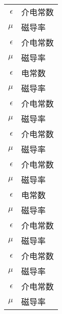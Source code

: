 \begin{nomenclature}
\begin{longtable}{rl}
  $\epsilon$    & 介电常数 \\
  $\mu$         & 磁导率 \\
  $\epsilon$    & 介电常数 \\
  $\mu$         & 磁导率 \\
  $\epsilon$    & 电常数 \\
  $\mu$         & 磁导率 \\
  $\epsilon$    & 介电常数 \\
  $\mu$         & 磁导率 \\
  $\epsilon$    & 介电常数 \\
  $\mu$         & 磁导率 \\
  $\epsilon$    & 介电常数 \\
  $\mu$         & 磁导率 \\
  $\epsilon$    & 电常数 \\
  $\mu$         & 磁导率 \\
  $\epsilon$    & 介电常数 \\
  $\mu$         & 磁导率 \\
  $\epsilon$    & 介电常数 \\
  $\mu$         & 磁导率 \\
  $\epsilon$    & 介电常数 \\
  $\mu$         & 磁导率 \\
\end{longtable}

\end{nomenclature}

